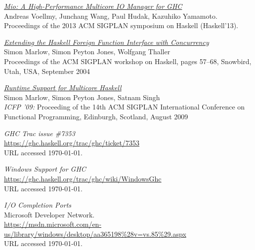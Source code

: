 \documentclass[a4paper,11pt,oneside]{report}
\begin{document}
\begin{thebibliography}{9}
  \href{http://haskell.cs.yale.edu/wp-content/uploads/2013/08/hask035-voellmy.pdf}{\emph{Mio:
      A High-Performance Multicore IO
      Manager for GHC}}\\
  \newblock Andreas Voellmy, Junchang Wang, Paul Hudak, Kazuhiko Yamamoto.\\
  \newblock Proceedings of the 2013 ACM SIGPLAN symposium on Haskell (Haskell'13).

  \href{http://community.haskell.org/~simonmar/bib/concffi04_abstract.html}{\emph{Extending the Haskell Foreign Function Interface with Concurrency}}\\
  \newblock Simon Marlow, Simon Peyton Jones, Wolfgang Thaller\\
  \newblock Proceedings of the ACM SIGPLAN workshop on Haskell, pages 57--68,
  Snowbird, Utah, USA, September 2004

  \href{http://community.haskell.org/~simonmar/bib/multicore-ghc-09_abstract.html}{\emph{Runtime Support for Multicore Haskell}}\\
  \newblock Simon Marlow, Simon Peyton Jones, Satnam Singh\\
  \newblock \emph{ICFP '09:} Proceeding of the 14th ACM SIGPLAN International
  Conference on Functional Programming, Edinburgh, Scotland, August 2009

 \emph{GHC Trac issue \#7353}\\
  \newblock \url{https://ghc.haskell.org/trac/ghc/ticket/7353}\\
  \newblock URL accessed \today.

 \emph{Windows Support for GHC}\\
  \newblock \url{https://ghc.haskell.org/trac/ghc/wiki/WindowsGhc}\\
  \newblock URL accessed \today.

 \emph{I/O Completion Ports}\\
  \newblock Microsoft Developer Network.\\
  \newblock
  \url{https://msdn.microsoft.com/en-us/library/windows/desktop/aa365198\%28v=vs.85\%29.aspx}\\
  \newblock URL accessed \today.

\end{thebibliography}

\appendix
\end{document}
